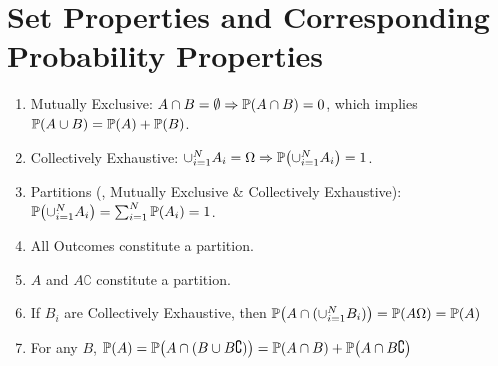 \section{Set Properties and Corresponding Probability Properties}
\begin{enumerate}
    \item Mutually Exclusive: $A \cap B = \emptyset \Rightarrow \P{A \cap B}=0$, which implies $\P{A \cup B} = \P{A}+\P{B}$.
    \item Collectively Exhaustive: $\cup_{i=1}^{N}A_i = \Omega \Rightarrow \P{\cup_{i=1}^{N}A_i} = 1$.
    \item Partitions (\ie, Mutually Exclusive \& Collectively Exhaustive): $\P{\cup_{i=1}^N A_i}=\sum_{i=1}^{N}\P{A_i}=1$.
    \item All Outcomes constitute a partition.
    \item $A$ and $A\complement$ constitute a partition.
    \item If $B_i$ are Collectively Exhaustive, then $\P{A\cap(\cup_{i=1}^N B_i)}=\P{A\Omega}=\P{A}$
    \item For any $B$, $\P{A}=\P{A\cap(B\cup B\complement)}=\P{A\cap B}+\P{A\cap B\complement}$
\end{enumerate}